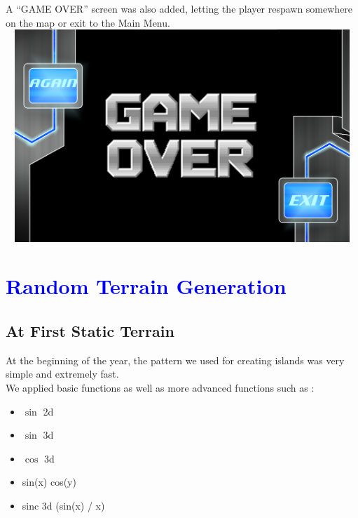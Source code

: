 \documentclass[article]{report}         %
\begin{document}
    A ``GAME OVER'' screen was also added, letting the player respawn somewhere on the map or exit to the Main Menu.\\

    \includegraphics[width=15cm, height=8cm]{images/Menus/death_screen_normal.png}


    \chapter{\textcolor{blue}{Random Terrain Generation}}
      \section{At First Static Terrain}
        At the beginning of the year, the pattern we used for creating islands was very simple and extremely fast.\\
        We applied basic functions as well as more advanced functions such as :

        \begin{itemize}
          
          \item $\sin$ 2d
          \item $\sin$ 3d
          \item $\cos$ 3d
          \item sin(x) cos(y)
          \item sinc 3d (sin(x) / x)
        \end{itemize}
\end{document}
